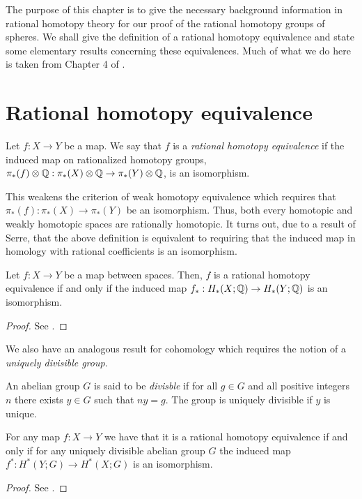 \documentclass[../main.tex]{subfiles}
\begin{document}
The purpose of this chapter is to give the necessary background information
in rational homotopy theory for our proof of the rational homotopy groups
of spheres. We shall give the definition of a rational homotopy
equivalence and state some elementary results concerning these
equivalences. Much of what we do here is taken from Chapter 4 of \cite[]{Ber12}.

\section{Rational homotopy equivalence}
\begin{definition}
    Let \( f:X\rightarrow Y \) be a map. We say that \( f \) is a
    \emph{rational homotopy equivalence} if the induced map on
    rationalized homotopy groups, \( \pi_*(f)\otimes\mathbb{Q}:\pi_*(X)\otimes
    \mathbb{Q}\rightarrow\pi_*(Y)\otimes\mathbb{Q}\), is an isomorphism.
\end{definition}
This weakens the criterion of weak homotopy equivalence which requires
that \( \pi_*(f):\pi_*(X)\rightarrow\pi_*(Y) \) be an isomorphism. Thus,
both every homotopic and weakly homotopic spaces are rationally homotopic.
It turns out, due to a result of Serre, that the above definition is
equivalent to requiring that the induced map in homology with rational
coefficients is an isomorphism.
\begin{proposition}
    Let \( f:X \rightarrow Y \) be a map between spaces. Then, \( f \)
    is a rational homotopy equivalence if and only if the induced
    map \( f_*:H_*(X;\mathbb{Q})\rightarrow H_*(Y;\mathbb{Q}) \) is an isomorphism.
\end{proposition}
\begin{proof}
    See \cite[]{Ser53}.
\end{proof}
We also have an analogous result for cohomology which requires the notion
of a \emph{uniquely divisible group}.
\begin{definition}
    An abelian group \( G \) is said to be \emph{divisble} if for all
    \( g \in G \) and all positive integers \( n \) there exists \( y
    \in G\) such that
    \( ny=g \). The group is uniquely divisible if \( y \) is unique.
\end{definition}
\begin{proposition}
   \label{prop:rat-cohomology}
   For any map \( f:X \rightarrow Y \) we have that it is a rational
   homotopy equivalence if and only if for any uniquely divisible
   abelian group \( G \) the induced map \( f^*:H^*(Y;G)\rightarrow 
   H^*(X;G)\) is an isomorphism.
\end{proposition}
\begin{proof}
    See \cite[]{Ber12}.
\end{proof}
\end{document}
